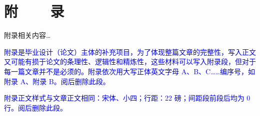 %
%
%
%
%
%

\chapter*{\vskip 10bp \textmd{附~~~~录} \vskip -6bp}

附录相关内容…

\textcolor{blue}{附录是毕业设计（论文）主体的补充项目，为了体现整篇文章的完整性，写入正文又可能有损于论文的条理性、逻辑性和精炼性，这些材料可以写入附录段，但对于每一篇文章并不是必须的。附录依次用大写正体英文字母 A、B、C……编序号，如附录 A、附录 B。阅后删除此段。}

\textcolor{blue}{附录正文样式与文章正文相同：宋体、小四；行距：22 磅；间距段前段后均为 0 行。阅后删除此段。}
